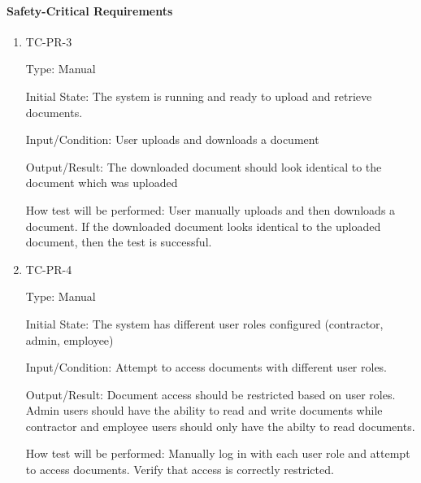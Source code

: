 \documentclass[12pt, titlepage]{article}
\begin{document}
\paragraph{Safety-Critical Requirements}
\begin{enumerate}

  \item {TC-PR-3\\}

    Type: Manual

    Initial State: The system is running and ready to upload and retrieve
    documents.

    Input/Condition: User uploads and downloads a document

    Output/Result: The downloaded document should look identical to the document which was uploaded

    How test will be performed: User manually uploads and then downloads a document. If the downloaded document looks
    identical to the uploaded document, then the test is successful.

  \item {TC-PR-4\\}

    Type: Manual

    Initial State: The system has different user roles configured (contractor, admin, employee)

    Input/Condition: Attempt to access documents with different user roles.

    Output/Result: Document access should be restricted based on user roles.
    Admin users should have the ability to read and write documents while
    contractor and employee users should only have the abilty to read documents.

    How test will be performed: Manually log in with each user role and
    attempt to access documents. Verify that access is correctly restricted.

\end{enumerate}
\end{document}
